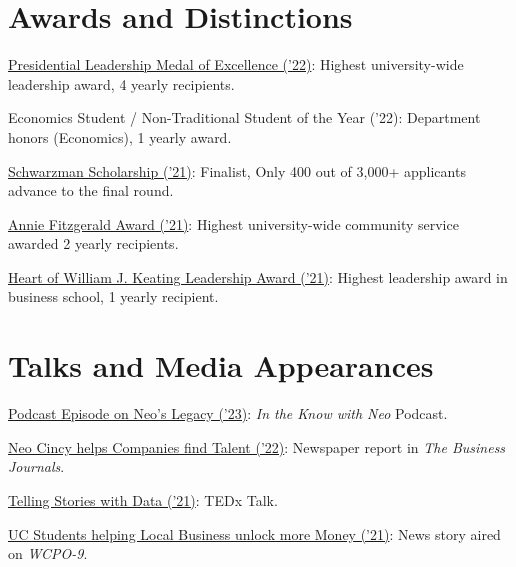 \documentclass[a4paper,20pt]{article}
\begin{document}
\section{Awards and Distinctions}
	\begin{description}[font=$\bullet$]
		\item{\href{https://www.uc.edu/news/articles/2022/05/uc-president-awards-leadership-medals-to-six-2022-grads.html}{Presidential Leadership Medal of Excellence ('22)}: Highest university-wide leadership award, 4 yearly recipients. }
		\vspace{-7pt}
		\item {Economics Student / Non-Traditional Student of the Year ('22): Department honors (Economics), 1 yearly award.}
		\vspace{-7pt}
		\item {\href{https://www.uc.edu/campus-life/nca/student-spotlight/profiles/daniel-posmik.html}{Schwarzman Scholarship ('21)}: Finalist, Only 400 out of 3,000+ applicants advance to the final round.}
		\vspace{-7pt}
		\item {\href{https://www.uc.edu/campus-life/cce/volunteer/awardsandscholarships.html}{Annie Fitzgerald Award ('21)}: Highest university-wide community service awarded 2 yearly recipients.}
		\vspace{-7pt}
		\item {\href{https://www.youtube.com/watch?v=N1KdIjCjeRE}{Heart of William J. Keating Leadership Award ('21)}: Highest leadership award in business school, 1 yearly recipient.}
		
\end{description}

\vspace{-5pt}
\section{Talks and Media Appearances}
	\begin{description}[font=$\bullet$]
		\item{\href{https://youtu.be/cTDl1OwIEnA}{Podcast Episode on Neo's Legacy ('23)}: \textit{In the Know with Neo} Podcast.}
		\vspace{-7pt}
	\item {\href{https://www.bizjournals.com/cincinnati/inno/stories/news/2021/09/16/uc-student-founded-program-helps-companies-find.html}{Neo Cincy helps Companies find Talent ('22)}: Newspaper report in \textit{The Business Journals}.}
 \vspace{-7pt}
	\item {\href{https://www.ted.com/talks/daniel_posmik_telling_stories_with_data}{Telling Stories with Data ('21)}: TEDx Talk.}
		\vspace{-7pt}
	\item {\href{https://youtu.be/F1mG_0bLIBo}{UC Students helping Local Business unlock more Money ('21)}: News story aired on \textit{WCPO-9}.}
		
\end{description}
\end{document}
